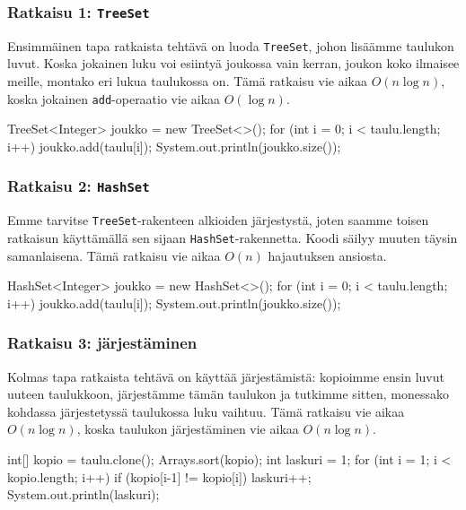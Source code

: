 \subsubsection{Ratkaisu 1: \texttt{TreeSet}}

Ensimmäinen tapa ratkaista tehtävä on luoda \texttt{TreeSet},
johon lisäämme taulukon luvut.
Koska jokainen luku voi esiintyä joukossa vain kerran,
joukon koko ilmaisee meille, montako eri lukua taulukossa on.
Tämä ratkaisu vie aikaa $O(n \log n)$, koska jokainen
\texttt{add}-operaatio vie aikaa $O(\log n)$.

\begin{code}
TreeSet<Integer> joukko = new TreeSet<>();
for (int i = 0; i < taulu.length; i++) {
    joukko.add(taulu[i]);
}
System.out.println(joukko.size());
\end{code}

\subsubsection{Ratkaisu 2: \texttt{HashSet}}

Emme tarvitse \texttt{TreeSet}-rakenteen
alkioiden järjestystä, joten saamme toisen ratkaisun
käyttämällä sen sijaan \texttt{HashSet}-rakennetta.
Koodi säilyy muuten täysin samanlaisena.
Tämä ratkaisu vie aikaa $O(n)$ hajautuksen ansiosta.

\begin{code}
HashSet<Integer> joukko = new HashSet<>();
for (int i = 0; i < taulu.length; i++) {
    joukko.add(taulu[i]);
}
System.out.println(joukko.size());
\end{code}

\subsubsection{Ratkaisu 3: järjestäminen}

Kolmas tapa ratkaista tehtävä on käyttää järjestämistä:
kopioimme ensin luvut uuteen taulukkoon, järjestämme tämän taulukon ja
tutkimme sitten, monessako kohdassa järjestetyssä taulukossa luku vaihtuu.
Tämä ratkaisu vie aikaa $O(n \log n)$, koska taulukon järjestäminen
vie aikaa $O(n \log n)$.

\begin{code}
int[] kopio = taulu.clone();
Arrays.sort(kopio);
int laskuri = 1;
for (int i = 1; i < kopio.length; i++) {
    if (kopio[i-1] != kopio[i]) laskuri++;
}
System.out.println(laskuri);
\end{code}

